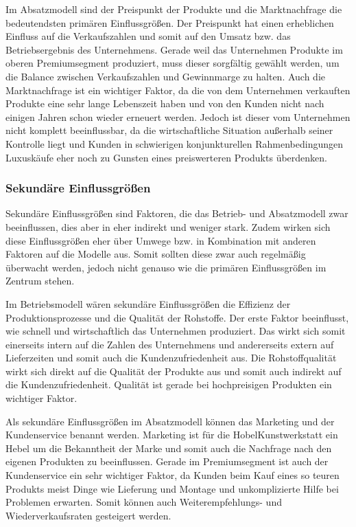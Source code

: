 Im Absatzmodell sind der Preispunkt der Produkte und die Marktnachfrage die bedeutendsten primären Einflussgrößen. Der Preispunkt hat einen erheblichen Einfluss auf die Verkaufszahlen und somit auf den Umsatz bzw. das Betriebsergebnis des Unternehmens. Gerade weil das Unternehmen Produkte im oberen Premiumsegment produziert, muss dieser sorgfältig gewählt werden, um die Balance zwischen Verkaufszahlen und Gewinnmarge zu halten. Auch die Marktnachfrage ist ein wichtiger Faktor, da die von dem Unternehmen verkauften Produkte eine sehr lange Lebenszeit haben und von den Kunden nicht nach einigen Jahren schon wieder erneuert werden. Jedoch ist dieser vom Unternehmen nicht komplett beeinflussbar, da die wirtschaftliche Situation außerhalb seiner Kontrolle liegt und Kunden in schwierigen konjunkturellen Rahmenbedingungen Luxuskäufe eher noch zu Gunsten eines preiswerteren Produkts überdenken. 

\subsubsection{Sekundäre Einflussgrößen}

Sekundäre Einflussgrößen sind Faktoren, die das Betrieb- und Absatzmodell zwar beeinflussen, dies aber in eher indirekt und weniger stark. Zudem wirken sich diese Einflussgrößen eher über Umwege bzw. in Kombination mit anderen Faktoren auf die Modelle aus. Somit sollten diese zwar auch regelmäßig überwacht werden, jedoch nicht genauso wie die primären Einflussgrößen im Zentrum stehen.

Im Betriebsmodell wären sekundäre Einflussgrößen die Effizienz der Produktionsprozesse und die Qualität der Rohstoffe. Der erste Faktor beeinflusst, wie schnell und wirtschaftlich das Unternehmen produziert. Das wirkt sich somit einerseits intern auf die Zahlen des Unternehmens und andererseits extern auf Lieferzeiten und somit auch die Kundenzufriedenheit aus. Die Rohstoffqualität wirkt sich direkt auf die Qualität der Produkte aus und somit auch indirekt auf die Kundenzufriedenheit. Qualität ist gerade bei hochpreisigen Produkten ein wichtiger Faktor.

Als sekundäre Einflussgrößen im Absatzmodell können das Marketing und der Kundenservice benannt werden. Marketing ist für die HobelKunstwerkstatt ein Hebel um die Bekanntheit der Marke und somit auch die Nachfrage nach den eigenen Produkten zu beeinflussen. Gerade im Premiumsegment ist auch der Kundenservice ein sehr wichtiger Faktor, da Kunden beim Kauf eines so teuren Produkts meist Dinge wie Lieferung und Montage und unkomplizierte Hilfe bei Problemen erwarten. Somit können auch Weiterempfehlungs- und Wiederverkaufsraten gesteigert werden.

